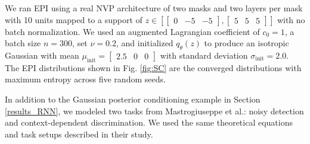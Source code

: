 \documentclass[11pt]{article}
\begin{document}
We ran EPI using a real NVP architecture of two masks and two layers per mask with 10 units mapped to a support of $z \in \left[ \begin{bmatrix} 0 & -5 & -5 \end{bmatrix}, \begin{bmatrix} 5 & 5 & 5  \end{bmatrix} \right]$ with no batch normalization. 
We used an augmented Lagrangian coefficient of $c_0 = 1$, a batch size $n=300$, set $\nu = 0.2$, and initialized $q_\theta(z)$ to produce an isotropic Gaussian with mean $\mu_{\text{init}} = \begin{bmatrix} 2.5 & 0 & 0 \end{bmatrix}$ with standard deviation $\sigma_{\text{init}} = 2.0$.
 The EPI distributions shown in Fig. \ref{fig:SC} are the converged distributions with maximum entropy across five random seeds.

In addition to the Gaussian posterior conditioning example in Section \ref{results_RNN}, we modeled two tasks from Mastrogiuseppe et al.: noisy detection and context-dependent discrimination.  We used the same theoretical equations and task setups described in their study.


\end{document}
